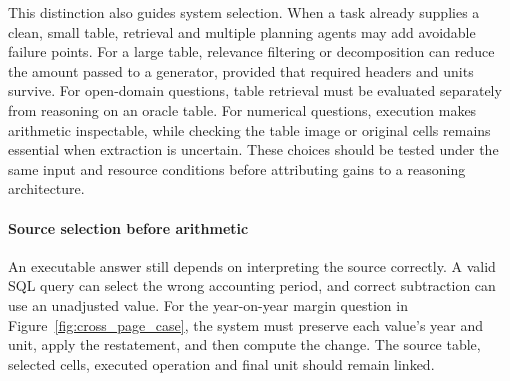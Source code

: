 This distinction also guides system selection. When a task already supplies a clean, small table, retrieval and multiple planning agents may add avoidable failure points. For a large table, relevance filtering or decomposition can reduce the amount passed to a generator, provided that required headers and units survive. For open-domain questions, table retrieval must be evaluated separately from reasoning on an oracle table. For numerical questions, execution makes arithmetic inspectable, while checking the table image or original cells remains essential when extraction is uncertain. These choices should be tested under the same input and resource conditions before attributing gains to a reasoning architecture.

\paragraph{Source selection before arithmetic}
An executable answer still depends on interpreting the source correctly. A valid SQL query can select the wrong accounting period, and correct subtraction can use an unadjusted value. For the year-on-year margin question in Figure~\ref{fig:cross_page_case}, the system must preserve each value's year and unit, apply the restatement, and then compute the change. The source table, selected cells, executed operation and final unit should remain linked.
